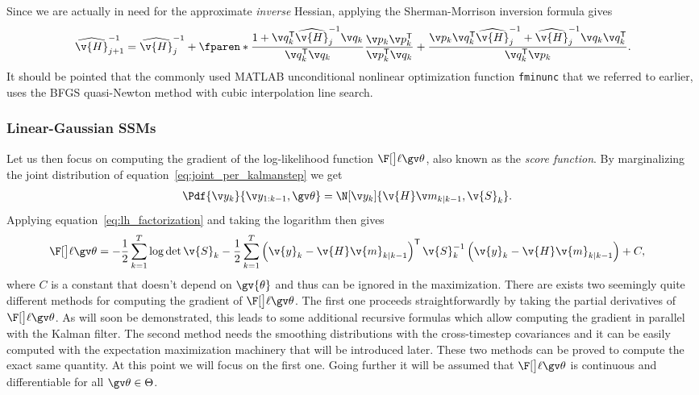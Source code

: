 Since we are actually in need for the approximate \emph{inverse} Hessian,
applying the Sherman-Morrison inversion formula gives
\begin{align}
	\widehat{\v{H}}_{j+1}^{-1}=\widehat{\v{H}}_{j}^{-1}+\fparen*{\frac{1+\q_k^\tr\widehat{\v{H}}_{j}^{-1}\q_k}{\q_k^\tr\q_k}}\frac{\p_k\p_k^\tr}{\p_k^\tr\q_k}+
	\frac{\p_k\q_k^\tr\widehat{\v{H}}^{-1}_{j}+\widehat{\v{H}}^{-1}_{j}\q_k\q_k^\tr}{\q_k^\tr\p_k}.
\end{align}
It should be pointed that the commonly used MATLAB unconditional nonlinear
optimization function \texttt{fminunc} that we referred to earlier, uses 
the BFGS quasi-Newton method with cubic interpolation line search.

\subsubsection{Linear-Gaussian SSMs}\label{sec:grad_LGSSM}

Let us then focus on computing the gradient of the
log-likelihood function $\lLH$, also known as the \emph{score function}.
By marginalizing the joint distribution of equation~\eqref{eq:joint_per_kalmanstep}
we get 
\begin{align}
	\Pdf{\y_k}{\y_{1:k-1},\Th}&=\N[\yk]{\v{H}\m_{k|k-1},\v{S}_k }.
\end{align}
Applying equation~\eqref{eq:lh_factorization} and taking the logarithm then gives
\begin{align}
	\lLH&=-\frac{1}{2}\sum_{k=1}^T\log\det{\v{S}_k}
	-\frac{1}{2}\sum_{k=1}^T\left(\v{y}_k-\v{H}\v{m}_{k|k-1}\right)^\tr\v{S}_{k}^{-1}\left(\v{y}_k-\v{H}\v{m}_{k|k-1}\right)+C,
	\label{eq:logLH}
\end{align}
where $C$ is a constant that doesn't depend on $\gv{\theta}$ and thus can
be ignored in the maximization.
There are exists two seemingly quite different methods for computing
the gradient of $\lLH$. The first one proceeds straightforwardly by taking the
partial derivatives of $\lLH$. As will soon be demonstrated, this leads
to some additional recursive formulas which allow computing
the gradient in parallel with the Kalman filter. The second method needs
the smoothing distributions with the cross-timestep covariances
and it can be easily computed with the expectation maximization machinery
that will be introduced later. These two methods can be proved to compute
the exact same quantity. At this point we will focus on the first one. Going further
it will be assumed that $\lLH$ is continuous and differentiable for all $\Th\in\Theta$.

